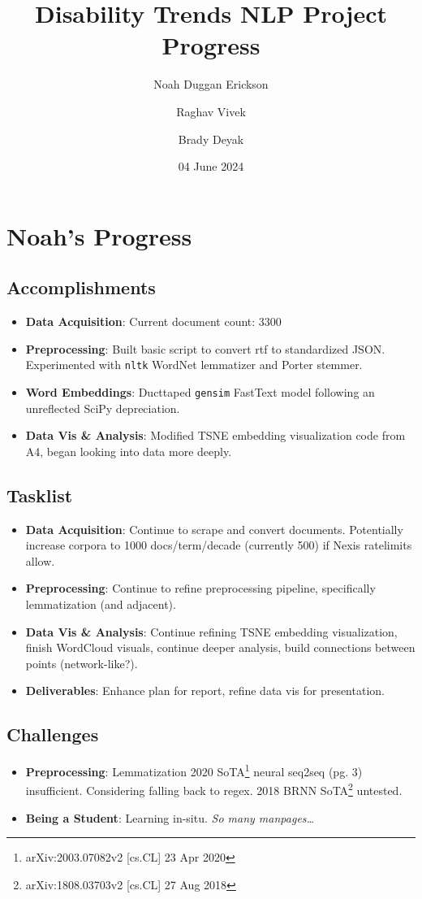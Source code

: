 \documentclass[letterpaper, twoside, draft]{article}
\title{Disability Trends NLP Project Progress}
\author{Noah Duggan Erickson \and Raghav Vivek \and Brady Deyak}
\date{04 June 2024}
\begin{document}
\maketitle

\section{Noah's Progress}
\subsection{Accomplishments}
\begin{itemize}
    \item \textbf{Data Acquisition}: Current document count: 3300
    \item \textbf{Preprocessing}: Built basic script to convert rtf to standardized JSON. Experimented with \texttt{nltk} WordNet lemmatizer and Porter stemmer.
    \item \textbf{Word Embeddings}: Ducttaped \texttt{gensim} FastText model following an unreflected SciPy depreciation.
    \item \textbf{Data Vis \& Analysis}: Modified TSNE embedding visualization code from A4, began looking into data more deeply.
\end{itemize}
\subsection{Tasklist}
\begin{itemize}
    \item \textbf{Data Acquisition}: Continue to scrape and convert documents. Potentially increase corpora to 1000 docs/term/decade (currently 500) if Nexis ratelimits allow.
    \item \textbf{Preprocessing}: Continue to refine preprocessing pipeline, specifically lemmatization (and adjacent).
    \item \textbf{Data Vis \& Analysis}: Continue refining TSNE embedding visualization, finish WordCloud visuals, continue deeper analysis, build connections between points (network-like?).
    \item \textbf{Deliverables}: Enhance plan for report, refine data vis for presentation.
\end{itemize}
\subsection{Challenges}
\begin{itemize}
    \item \textbf{Preprocessing}: Lemmatization 2020 SoTA\footnote{arXiv:2003.07082v2 [cs.CL] 23 Apr 2020} neural seq2seq (pg. 3) insufficient. Considering falling back to regex. 2018 BRNN SoTA\footnote{arXiv:1808.03703v2 [cs.CL] 27 Aug 2018} untested.
    \item \textbf{Being a Student}: Learning in-situ. \textit{So many manpages\dots}
\end{itemize}
\end{document}
